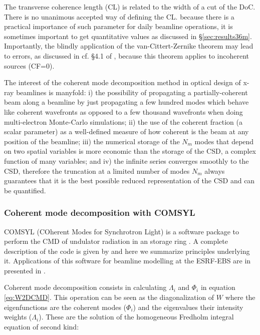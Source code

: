 \documentclass{iucr}              %
\begin{document}
The transverse coherence length (CL) is related to the width of a cut of the DoC. There is no unanimous accepted way of defining the CL. because there is a practical importance of such parameter for daily beamline operations, it is sometimes important to get quantitative values as discussed in \S{\ref{sec:results36m}}. Importantly, the blindly application of the van-Cittert-Zernike theorem may lead to errors, as discussed in cf. §4.1 of \cite{geloni2008}, because this theorem applies to incoherent sources (CF=0). 


The interest of the coherent mode decomposition method in optical design of x-ray beamlines is manyfold: i) the possibility of propagating a partially-coherent beam along a beamline by just propagating a few hundred modes which behave like coherent wavefronts as opposed to a few thousand wavefronts when doing multi-electron Monte-Carlo simulations; ii) the use of the coherent fraction (a scalar parameter) as a well-defined measure of how coherent is the beam at any position of the beamline; iii) the numerical storage of the $N_m$ modes that depend on two spatial variables is more economic than the storage of the CSD, a complex function of many variables; and iv) the infinite series converges smoothly to the CSD, therefore the truncation at a limited number of modes $N_m$ always guarantees that it is the best possible reduced representation of the CSD and can be quantified.


\subsubsection{Coherent mode decomposition with COMSYL\\}\label{sec:COMSYL} 
 COMSYL (COherent Modes for Synchrotron Light) is a software package to perform the CMD of undulator radiation in an storage ring \cite{codeCOMSYL}. A complete description of the code is given by  and here we summarize principles underlying it. Applications of this software for beamline modelling at the ESRF-EBS are in presented in \cite{glass2017, hierarchical}. 


Coherent mode decomposition consists in calculating $\Lambda_i$ and $\Phi_i$ in equation \ref{eq:W2DCMD}. This operation can be seen as the diagonalization of $W$ where the eigenfunctions are the coherent modes ($\Phi_i$) and the eigenvalues their intensity weights ($\Lambda_i$). These are the solution of the homogeneous Fredholm integral equation of second kind:
\end{document}
